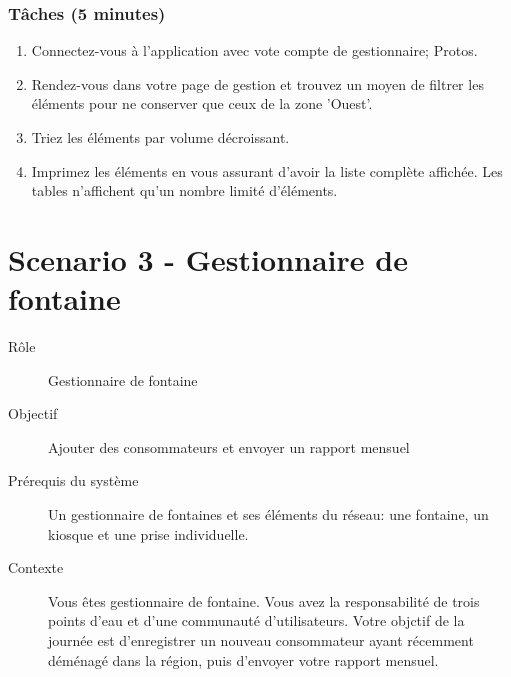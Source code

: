 \documentclass[a4paper, 11pt]{article}
\begin{document}
    \subsubsection*{Tâches (5 minutes)}
        \begin{enumerate}
            \item Connectez-vous à l'application avec vote compte de gestionnaire; Protos.
            \item Rendez-vous dans votre page de gestion et trouvez un moyen de filtrer les éléments pour ne conserver que ceux de la zone 'Ouest'.
            \item Triez les éléments par volume décroissant.
            \item Imprimez les éléments en vous assurant d'avoir la liste complète affichée. Les tables n'affichent qu'un nombre limité d'éléments.
        \end{enumerate}

\newpage

\section*{Scenario 3 - Gestionnaire de fontaine}
    \begin{description}
        \item[Rôle] Gestionnaire de fontaine
        \item[Objectif] Ajouter des consommateurs et envoyer un rapport mensuel
        \item[Prérequis du système] Un gestionnaire de fontaines et ses éléments du réseau: une fontaine, un kiosque et une prise individuelle.
        \item[Contexte] Vous êtes gestionnaire de fontaine. Vous avez la responsabilité de trois points d'eau et d'une communauté d'utilisateurs. Votre objctif de la journée est d'enregistrer un nouveau consommateur ayant récemment déménagé dans la région, puis d'envoyer votre rapport mensuel.
    \end{description}
\end{document}
